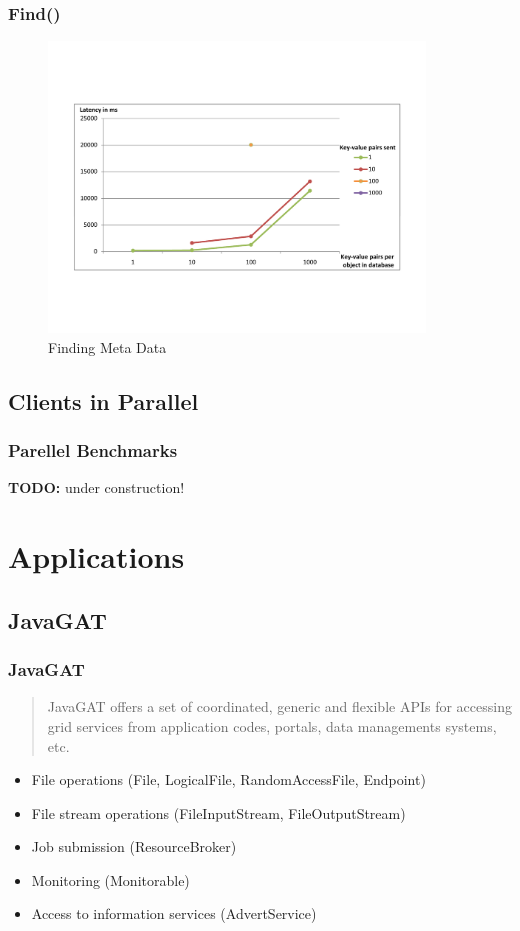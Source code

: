 \documentclass{beamer}
\begin{document}
\frame
{
	\frametitle{Find()}
	\begin{figure}[t]
	\begin{center}
	\includegraphics[trim = 0 5cm 0 5cm, width=10cm]{find_amt.pdf} 
	\caption{Finding Meta Data}
	\end{center}
	\end{figure}
}

\subsection{Clients in Parallel}
\frame
{
	\frametitle{Parellel Benchmarks}
	\textbf{TODO:} under construction!
}

\section{Applications}
\subsection{JavaGAT}
\frame
{
	\frametitle{JavaGAT}
	\begin{quote}
		JavaGAT offers a set of coordinated, generic and flexible APIs for accessing
		grid services from application codes, portals, data managements systems, etc.
	\end{quote}
	
	\begin{itemize}
		\item File operations (File, LogicalFile, RandomAccessFile, Endpoint)
		\item File stream operations (FileInputStream, FileOutputStream)
		\item Job submission (ResourceBroker)
		\item Monitoring (Monitorable)
		\item Access to information services (AdvertService)
	\end{itemize}
}
\end{document}
